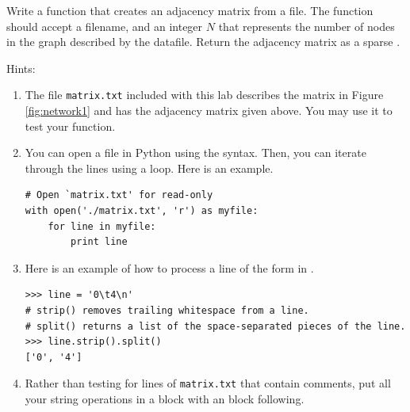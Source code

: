 \begin{problem}
Write a function that creates an adjacency matrix from a file. The function should accept a filename, and an integer $N$ that represents the number of nodes in the graph described by the datafile. Return the adjacency matrix as a  sparse . \\

Hints:
\begin{enumerate}
\item The file \texttt{matrix.txt} included with this lab describes the matrix in Figure \ref{fig:network1} and has the adjacency matrix  given above.
You may use it to test your function.

\item You can open a file in Python using the  syntax.
Then, you can iterate through the lines using a  loop.
Here is an example.
\begin{lstlisting}
# Open `matrix.txt' for read-only
with open('./matrix.txt', 'r') as myfile:
    for line in myfile:
        print line
\end{lstlisting}

\item Here is an example of how to process a line of the form in .
\begin{lstlisting}
>>> line = '0\t4\n'
# strip() removes trailing whitespace from a line.
# split() returns a list of the space-separated pieces of the line.
>>> line.strip().split()
['0', '4']
\end{lstlisting}

\item Rather than testing for lines of \texttt{matrix.txt} that contain comments, put all your string operations in a  block with an  block following.
\end{enumerate}
\end{problem}

